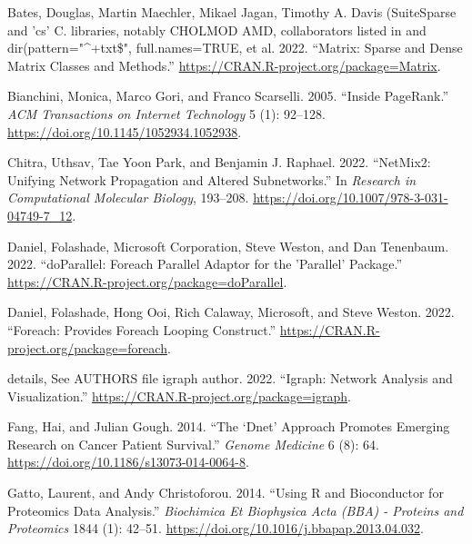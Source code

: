 \documentclass{article}
\newlength{\cslhangindent}
\newlength{\cslentryspacingunit} %
\newenvironment{CSLReferences}[2] %
 {%
  \setlength{\parindent}{0pt}
  \ifodd #1
  \let\oldpar\par
  \def\par{\hangindent=\cslhangindent\oldpar}
  \fi
  \setlength{\parskip}{#2\cslentryspacingunit}
 }%
 {}
\begin{document}
\hypertarget{refs}{}
\begin{CSLReferences}{1}{0}
\leavevmode{}%
Bates, Douglas, Martin Maechler, Mikael Jagan, Timothy A. Davis
(SuiteSparse and 'cs' C. libraries, notably CHOLMOD AMD, collaborators
listed in and dir(pattern="\^{}+txt\$", full.names=TRUE, et al. 2022.
{``Matrix: {Sparse} and {Dense} {Matrix} {Classes} and {Methods}.''}
\url{https://CRAN.R-project.org/package=Matrix}.

\leavevmode{}%
Bianchini, Monica, Marco Gori, and Franco Scarselli. 2005. {``Inside
{PageRank}.''} \emph{ACM Transactions on Internet Technology} 5 (1):
92--128. \url{https://doi.org/10.1145/1052934.1052938}.

\leavevmode{}%
Chitra, Uthsav, Tae Yoon Park, and Benjamin J. Raphael. 2022.
{``{NetMix2}: {Unifying} {Network} {Propagation} and {Altered}
{Subnetworks}.''} In \emph{Research in {Computational} {Molecular}
{Biology}}, 193--208.
\url{https://doi.org/10.1007/978-3-031-04749-7_12}.

\leavevmode{}%
Daniel, Folashade, Microsoft Corporation, Steve Weston, and Dan
Tenenbaum. 2022. {``{doParallel}: {Foreach} {Parallel} {Adaptor} for the
'Parallel' {Package}.''}
\url{https://CRAN.R-project.org/package=doParallel}.

\leavevmode{}%
Daniel, Folashade, Hong Ooi, Rich Calaway, Microsoft, and Steve Weston.
2022. {``Foreach: {Provides} {Foreach} {Looping} {Construct}.''}
\url{https://CRAN.R-project.org/package=foreach}.

\leavevmode{}%
details, See AUTHORS file igraph author. 2022. {``Igraph: {Network}
{Analysis} and {Visualization}.''}
\url{https://CRAN.R-project.org/package=igraph}.

\leavevmode{}%
Fang, Hai, and Julian Gough. 2014. {``The `Dnet' Approach Promotes
Emerging Research on Cancer Patient Survival.''} \emph{Genome Medicine}
6 (8): 64. \url{https://doi.org/10.1186/s13073-014-0064-8}.

\leavevmode{}%
Gatto, Laurent, and Andy Christoforou. 2014. {``Using {R} and
{Bioconductor} for Proteomics Data Analysis.''} \emph{Biochimica Et
Biophysica Acta (BBA) - Proteins and Proteomics} 1844 (1): 42--51.
\url{https://doi.org/10.1016/j.bbapap.2013.04.032}.


\end{CSLReferences}
\end{document}
